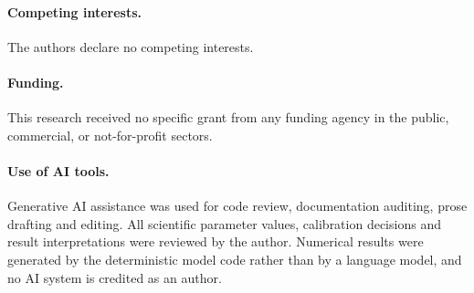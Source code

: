 \documentclass[11pt]{article}
\begin{document}
\paragraph{Competing interests.} The authors declare no competing
interests.

\paragraph{Funding.} This research received no specific grant from any
funding agency in the public, commercial, or not-for-profit sectors.

\paragraph{Use of AI tools.} Generative AI assistance was used for
code review, documentation auditing, prose drafting and editing. All
scientific parameter values, calibration decisions and result
interpretations were reviewed by the author. Numerical results were
generated by the deterministic model code rather than by a language
model, and no AI system is credited as an author.



\end{document}

